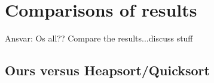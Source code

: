 \section{Comparisons of results}
Ansvar: Os all?? 
Compare the results...discuss stuff

\subsection{Ours versus Heapsort/Quicksort}
